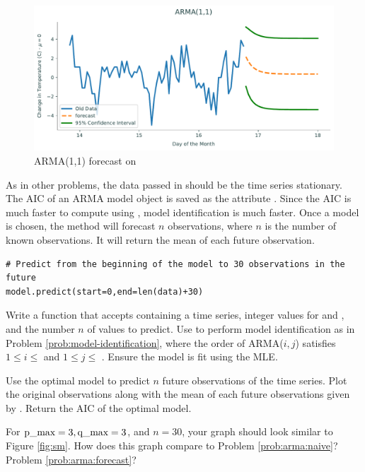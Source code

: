 \begin{figure}
\centering
\includegraphics[width=\textwidth]{figures/arma.pdf}
\caption{ARMA(1,1) forecast on }
\label{fig:forecasted}
\end{figure}

As in other problems, the data passed in should be the time series stationary.
The AIC of an ARMA model object is saved as the attribute .
Since the AIC is much faster to compute using , model identification is much faster.
Once a model is chosen, the method  will forecast $n$ observations, where $n$ is the number of known observations.
It will return the mean of each future observation.

\begin{lstlisting}
# Predict from the beginning of the model to 30 observations in the future
model.predict(start=0,end=len(data)+30)
\end{lstlisting}

\begin{problem}
Write a function  that accepts  containing a time series, integer values for  and , and the number $n$ of values to predict.
Use  to perform model identification as in Problem \ref{prob:model-identification}, where the order of ARMA($i,j$) satisfies $1\leq i \leq$  and $1 \leq j \leq$ .
Ensure the model is fit using the MLE.

Use the optimal model to predict $n$ future observations of the time series.
Plot the original observations along with the mean of each future observations given by .
Return the AIC of the optimal model.

For $\text{\li{p_max}}=3, \text{\li{q_max}}=3$, and $n=30$, your graph should look similar to Figure \ref{fig:sm}.
How does this graph compare to Problem \ref{prob:arma:naive}? Problem \ref{prob:arma:forecast}?
\label{prob:statsmodels}
\end{problem}

